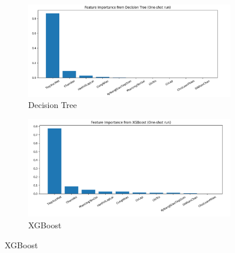 \documentclass[conference]{IEEEtran}
\begin{document}
\begin{figure}[H]
    \centering
    \begin{subfigure}[b]{0.45\linewidth}
        \includegraphics[width=\linewidth]{images/feature_dt.png}
        \caption{Decision Tree}
        \label{fig:x1}
    \end{subfigure}
    \hfill
    \begin{subfigure}[b]{0.45\linewidth}
        \includegraphics[width=\linewidth]{images/feature_xgb.png}
        \caption{XGBoost}
        \label{fig:x2}
    \end{subfigure}

    \vspace{1em}


\end{figure}
\end{document}

